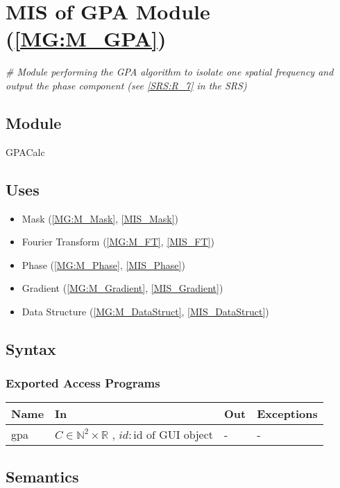 \documentclass[12pt, titlepage]{article}
\begin{document}
\section{MIS of GPA Module (\texorpdfstring{\cref{MG:M_GPA}}))} \label{MIS_GPA}

\noindent\textit{{\#} Module performing the GPA algorithm to isolate one spatial 
frequency and output the phase component (see \cref{SRS:R_7} in the SRS)}

\subsection{Module}
GPACalc
\subsection{Uses}
\begin{itemize}
\item Mask (\cref{MG:M_Mask}, \cref{MIS_Mask})
\item Fourier Transform (\cref{MG:M_FT}, \cref{MIS_FT})
\item Phase (\cref{MG:M_Phase}, \cref{MIS_Phase})
\item Gradient (\cref{MG:M_Gradient}, \cref{MIS_Gradient})
\item Data Structure (\cref{MG:M_DataStruct}, \cref{MIS_DataStruct})
\end{itemize}

\subsection{Syntax}

\subsubsection{Exported Access Programs}

\begin{center}
\begin{tabular}{p{2cm} p{4cm} p{4cm} p{2cm}}
\hline
\textbf{Name} & \textbf{In} & \textbf{Out} & \textbf{Exceptions} \\
\hline
gpa & $C \in \mathbb{N}^2\times\mathbb{R}$ , $id : \text{id of GUI object}$ & - 
& - \\
\hline
\end{tabular}
\end{center}

\subsection{Semantics}
\end{document}
